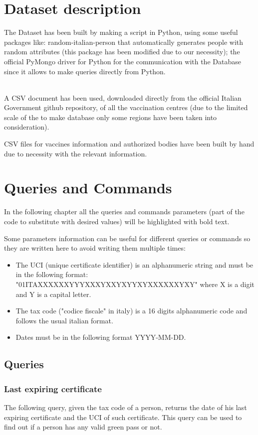 \documentclass{article}
\begin{document}
\section{Dataset description}
The Dataset has been built by making a script in Python, using some useful packages like: {\selectfont random-italian-person} that automatically generates people with random attributes (this package has been modified due to our necessity); the official {\selectfont PyMongo} driver for Python for the communication with the Database since it allows to make queries directly from Python.

\\
\hfill\break
A CSV document has been used, downloaded directly from the official Italian Government github repository, of all the vaccination centres (due to the limited scale of the to make database only some regions have been taken into consideration).

CSV files for vaccines information and authorized bodies have been built by hand due to necessity with the relevant information.


\newpage
\section{Queries and Commands}
In the following chapter all the queries and commands parameters (part of the code to substitute with desired values) will be highlighted with \textbf{\color{magenta}{magenta}} bold text.

Some parameters information can be useful for different queries or commands so they are written here to avoid writing them multiple times:
\begin{itemize}
    \item The UCI (unique certificate identifier) is an alphanumeric string and must be in the following format: \\"01ITAXXXXXXYYYXXXYXXYXYYXYXXXXXXYXY" where X is a digit and Y is a capital letter.
    \item The tax code ("codice fiscale" in italy) is a 16 digits alphanumeric code and follows the usual italian format.
    \item Dates must be in the following format YYYY-MM-DD.
\end{itemize}
\subsection{Queries}
\subsubsection{Last expiring certificate}
The following query, given the tax code of a person, returns the date of his last expiring certificate and the UCI of such certificate. This query can be used to find out if a person
has any valid green pass or not.
\end{document}
